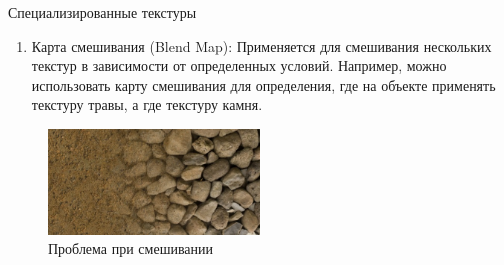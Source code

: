 \documentclass{beamer}
\begin{document}
	\begin{frame}{Специализированные текстуры}
		\begin{enumerate}		
			\item Карта смешивания (Blend Map): Применяется для смешивания нескольких текстур в зависимости от определенных условий. Например, можно использовать карту смешивания для определения, где на объекте применять текстуру травы, а где текстуру камня.
			\end{enumerate}

			\begin{figure} 
				\includegraphics[width=0.5\textwidth]{images/blend_1.jpg}
				\caption{Проблема при смешивании}
			\end{figure}


	\end{frame}
\end{document}
